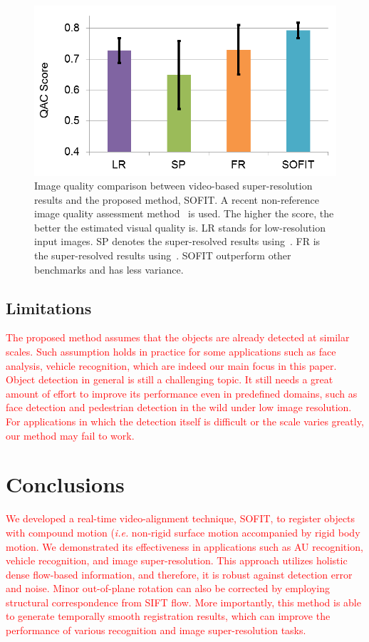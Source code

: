 \documentclass[10pt,journal]{IEEEtran}
\newcommand{\Songfan}[1]{\textcolor{red}{#1}}
\begin{document}
\begin{figure}[t]
	\centering
		\includegraphics[width=.8\columnwidth]{fig/SR_quant.png}
	\caption{Image quality comparison between video-based super-resolution results and the proposed method, SOFIT. A recent non-reference image quality assessment method~\cite{Xue_CVPR13} is used. The higher the score, the better the estimated visual quality is. LR stands for low-resolution input images. SP denotes the super-resolved results using~\cite{Keren_CVPR88}. FR is the super-resolved results using~\cite{Vandewalle06}. SOFIT outperform other benchmarks and has less variance. }
	\label{fig:SR_quant}
\end{figure}

\subsection{Limitations}
\Songfan{
The proposed method assumes that the objects are already detected at similar scales. Such assumption holds in practice for some applications such as face analysis, vehicle recognition, which are indeed our main focus in this paper. Object detection in general is still a challenging topic. It still needs a great amount of effort to improve its performance even in predefined domains, such as face detection and pedestrian detection in the wild under low image resolution. For applications in which the detection itself is difficult or the scale varies greatly, our method may fail to work.
}

\section{Conclusions\label{sec:conclusion}}

\Songfan{
We developed a real-time video-alignment technique, SOFIT, to register objects with compound motion (\textit{i.e.} non-rigid surface motion accompanied by rigid body motion. We demonstrated its effectiveness in applications such as AU recognition, vehicle recognition, and image super-resolution. This approach utilizes holistic dense flow-based information, and therefore, it is robust against detection error and noise. Minor out-of-plane rotation can also be corrected by employing structural correspondence from SIFT flow. More importantly, this method is able to generate temporally smooth registration results, which can improve the performance of various recognition and image super-resolution tasks.
}
\end{document}

